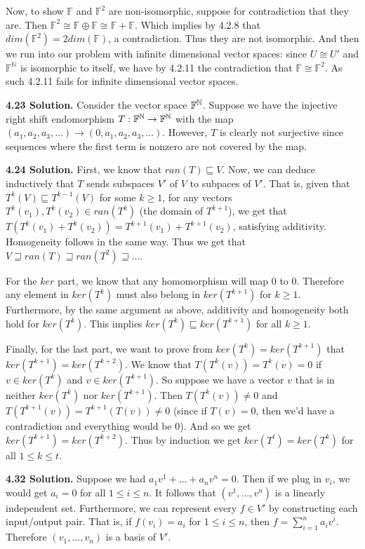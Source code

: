 Now, to show $\mathbb{F}$ and $\mathbb{F}^2$ are non-isomorphic, suppose for contradiction that they are. Then $\mathbb{F}^2 \cong \mathbb{F} \oplus \mathbb{F} \cong \mathbb{F} + \mathbb{F}$. Which implies by 4.2.8 that $dim(\mathbb{F}^2) = 2dim(\mathbb{F})$, a contradiction. Thus they are not isomorphic. And then we run into our problem with infinite dimensional vector spaces: since $U \cong U'$ and $\mathbb{F}^{\mathbb{N}}$ is isomorphic to itself, we have by 4.2.11 the contradiction that $\mathbb{F} \cong \mathbb{F}^2$. As such 4.2.11 fails for infinite dimensional vector spaces.

\textbf{4.23 Solution.} Consider the vector space $\mathbb{F}^{\mathbb{N}}$. Suppose we have the injective right shift endomorphism $T: \mathbb{F}^{\mathbb{N}} \to \mathbb{F}^{\mathbb{N}}$ with the map $(a_1, a_2, a_3, \ldots) \to (0, a_1, a_2, a_3, \ldots)$. However, $T$ is clearly not surjective since sequences where the first term is nonzero are not covered by the map.

\textbf{4.24 Solution.} First, we know that $ran(T) \sqsubseteq V$. Now, we can deduce inductively that $T$ sends subspaces $V'$ of $V$ to subpaces of $V'$. That is, given that $T^k(V) \sqsubseteq T^{k-1}(V)$ for some $k \geq 1$, for any vectors $T^k(v_1), T^k(v_2) \in ran(T^k)$ (the domain of $T^{k+1}$), we get that $T(T^k(v_1) + T^k(v_2)) = T^{k+1}(v_1) + T^{k+1}(v_2)$, satisfying additivity. Homogeneity follows in the same way. Thus we get that $V \sqsupseteq ran(T) \sqsupseteq ran(T^2) \sqsupseteq \ldots$.

For the $ker$ part, we know that any homomorphism will map $0$ to $0$. Therefore any element in $ker(T^k)$ must also belong in $ker(T^{k+1})$ for $k \geq 1$. Furthermore, by the same argument as above, additivity and homogeneity both hold for $ker(T^k)$. This implies $ker(T^k) \sqsubseteq ker(T^{k+1})$ for all $k \geq 1$.

Finally, for the last part, we want to prove from $ker(T^k) = ker(T^{k+1})$ that $ker(T^{k+1}) = ker(T^{k+2})$. We know that $T(T^k(v)) = T^k(v) = 0$ if $v \in ker(T^k)$ and $v \in ker(T^{k+1})$. So suppose we have a vector $v$ that is in neither $ker(T^k)$ nor $ker(T^{k+1})$. Then $T(T^k(v)) \neq 0$ and $T(T^{k+1}(v)) = T^{k+1}(T(v)) \neq 0$ (since if $T(v) = 0$, then we'd have a contradiction and everything would be 0). And so we get $ker(T^{k+1}) = ker(T^{k+2})$. Thus by induction we get $ker(T^t) = ker(T^k)$ for all $1 \leq k \leq t$.

\textbf{4.32 Solution.} Suppose we had $a_1v^1 + \dots + a_nv^n = 0$. Then if we plug in $v_i$, we would get $a_i = 0$ for all $1 \leq i \leq n$. It follows that $(v^1, \dots, v^n)$ is a linearly independent set. Furthermore, we can represent every $f \in V'$ by constructing each input/output pair. That is, if $f(v_i) = a_i$ for $1 \leq i \leq n$, then $f = \sum\limits_{i = 1}^{n}a_iv^i$. Therefore $(v_1, \dots, v_n)$ is a basis of $V'$.

